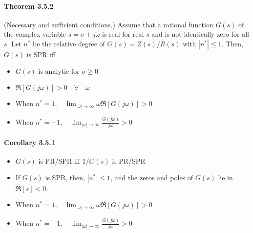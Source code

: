 \paragraph{Theorem 3.5.2}
(Necessary and sufficient conditions.) Assume that a rational function $G(s)$ of the complex variable $s = \sigma + j\omega$ is real for real $s$ and is not identically zero for all $s$. Let $n^*$ be the relative degree of $G(s) = Z(s) / R(s)$ with $|n^*| \leq 1$. Then, $G(s)$ is SPR iff
\begin{itemize}
	\item $G(s)$ is analytic for $\sigma \geq 0$
	\item $\Re[G(j\omega)] > 0 \quad \forall \quad \omega$
	\item When $n^* = 1, \quad \lim_{|\omega| \to \infty} \omega \Re[G(j\omega)] > 0 $
	\item When $n^* = -1,\quad \lim_{|\omega| \to \infty} \frac{G(j\omega)}{j\omega} >0 $
\end{itemize}

\paragraph{Corollary 3.5.1}
\begin{itemize}
	\item $G(s)$ is PR/SPR iff $1/G(s)$ is PR/SPR
	\item If $G(s)$ is SPR, then, $|n^*| \leq 1$, and the zeros and poles of $G(s)$ lie in $\Re[s]<0$.
	\item When $n^* = 1, \quad \lim_{|\omega| \to \infty} \omega \Re[G(j\omega)] > 0 $
	\item When $n^* = -1,\quad \lim_{|\omega| \to \infty} \frac{G(j\omega)}{j\omega} >0 $
\end{itemize}

